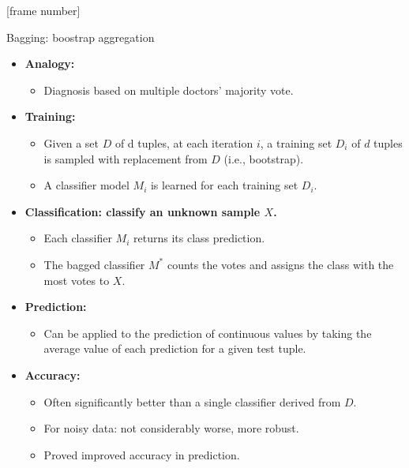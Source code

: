 \documentclass[aspectratio=169,t,table]{beamer}
\begin{document}
  {
    [frame number]
    \begin{frame}{Bagging: boostrap aggregation}
      \begin{itemize}
        \item \textbf{Analogy:}
        \begin{itemize}
          \item Diagnosis based on multiple doctors' majority vote.
        \end{itemize}
        \item \textbf{Training:}
        \begin{itemize}
          \item Given a set $D$ of d tuples, at each iteration $i$, a training set $D_i$ of $d$ tuples is sampled with replacement from $D$ (i.e., bootstrap).
          \item A classifier model $M_i$ is learned for each training set $D_i$.
        \end{itemize}
        \item \textbf{Classification: classify an unknown sample $X$.}
        \begin{itemize}
          \item Each classifier $M_i$ returns its class prediction.
          \item The bagged classifier $M^*$ counts the votes and assigns the class with the most votes to $X$.
        \end{itemize}
        \item \textbf{Prediction:}
        \begin{itemize}
          \item Can be applied to the prediction of continuous values by taking the average value of each prediction for a given test tuple.
        \end{itemize}
        \item \textbf{Accuracy:}
        \begin{itemize}
          \item Often significantly better than a single classifier derived from $D$.
          \item For noisy data: not considerably worse, more robust.
          \item Proved improved accuracy in prediction.
        \end{itemize}
      \end{itemize}
    \end{frame}
  }
\end{document}
